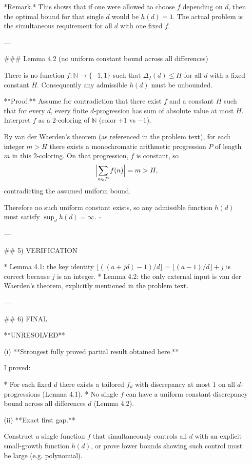 *Remark.* This shows that if one were allowed to choose $f$ depending on $d$, then the optimal bound for that single $d$ would be $h(d)=1$. The actual problem is the simultaneous requirement for all $d$ with one fixed $f$.

---

### Lemma 4.2 (no uniform constant bound across all differences)

There is no function $f:\mathbb N\to\{-1,1\}$ such that $\Delta_f(d)\le H$ for all $d$ with a fixed constant $H$.
Consequently any admissible $h(d)$ must be unbounded.

**Proof.**
Assume for contradiction that there exist $f$ and a constant $H$ such that for every $d$, every finite $d$-progression has sum of absolute value at most $H$.
Interpret $f$ as a 2-coloring of $\mathbb N$ (color $+1$ vs $-1$).

By van der Waerden’s theorem (as referenced in the problem text), for each integer $m>H$ there exists a monochromatic arithmetic progression $P$ of length $m$ in this 2-coloring.
On that progression, $f$ is constant, so
\[
\Bigl|\sum_{n\in P} f(n)\Bigr|=m>H,
\]
contradicting the assumed uniform bound.

Therefore no such uniform constant exists, so any admissible function $h(d)$ must satisfy $\sup_d h(d)=\infty$.
$\square$

---

## 5) VERIFICATION

* Lemma 4.1: the key identity $\lfloor((a+jd)-1)/d\rfloor=\lfloor(a-1)/d\rfloor+j$ is correct because $j$ is an integer.
* Lemma 4.2: the only external input is van der Waerden’s theorem, explicitly mentioned in the problem text.

---

## 6) FINAL

**UNRESOLVED**

(i) **Strongest fully proved partial result obtained here.**

I proved:

* For each fixed $d$ there exists a tailored $f_d$ with discrepancy at most $1$ on all $d$-progressions (Lemma 4.1).
* No single $f$ can have a uniform constant discrepancy bound across all differences $d$ (Lemma 4.2).

(ii) **Exact first gap.**

Construct a single function $f$ that simultaneously controls all $d$ with an explicit small-growth function $h(d)$, or prove lower bounds showing such control must be large (e.g. polynomial).

